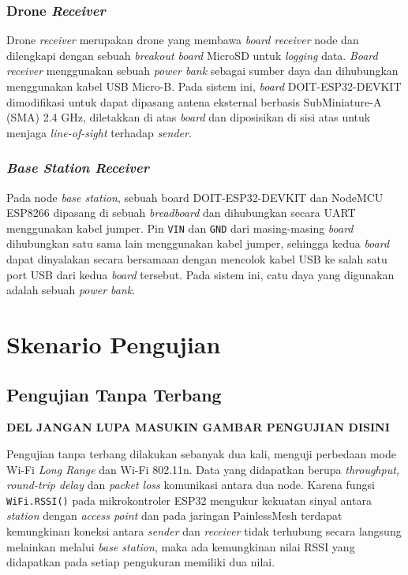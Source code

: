 \subsubsection{Drone \textit{Receiver}}

Drone \textit{receiver} merupakan drone yang membawa \textit{board receiver} node dan dilengkapi dengan sebuah \textit{breakout board} MicroSD untuk \textit{logging} data. \textit{Board receiver} menggunakan sebuah \textit{power bank} sebagai sumber daya dan dihubungkan menggunakan kabel USB Micro-B. Pada sistem ini, \textit{board} DOIT-ESP32-DEVKIT dimodifikasi untuk dapat dipasang antena eksternal berbasis SubMiniature-A (SMA) 2.4 GHz, diletakkan di atas \textit{board} dan diposisikan di sisi atas untuk menjaga \textit{line-of-sight} terhadap \textit{sender}.

\subsubsection{\textit{Base Station Receiver}}

Pada node \textit{base station}, sebuah board DOIT-ESP32-DEVKIT dan NodeMCU ESP8266 dipasang di sebuah \textit{breadboard} dan dihubungkan secara UART menggunakan kabel jumper. Pin \verb|VIN| dan \verb|GND| dari masing-masing \textit{board} dihubungkan satu sama lain menggunakan kabel jumper, sehingga kedua \textit{board} dapat dinyalakan secara bersamaan dengan mencolok kabel USB ke salah satu port USB dari kedua \textit{board} tersebut. Pada sistem ini, catu daya yang digunakan adalah sebuah \textit{power bank}.

\section{Skenario Pengujian}
\subsection{Pengujian Tanpa Terbang}

\textbf{DEL JANGAN LUPA MASUKIN GAMBAR PENGUJIAN DISINI}

Pengujian tanpa terbang dilakukan sebanyak dua kali, menguji perbedaan mode Wi-Fi \textit{Long Range} dan Wi-Fi 802.11n. Data yang didapatkan berupa \textit{throughput, round-trip delay} dan \textit{packet loss} komunikasi antara dua node. Karena fungsi \verb|WiFi.RSSI()| pada mikrokontroler ESP32 mengukur kekuatan sinyal antara \textit{station} dengan \textit{access point} dan pada jaringan PainlessMesh terdapat kemungkinan koneksi antara \textit{sender} dan \textit{receiver} tidak terhubung secara langsung melainkan melalui \textit{base station}, maka ada kemungkinan nilai RSSI yang didapatkan pada setiap pengukuran memiliki dua nilai.

